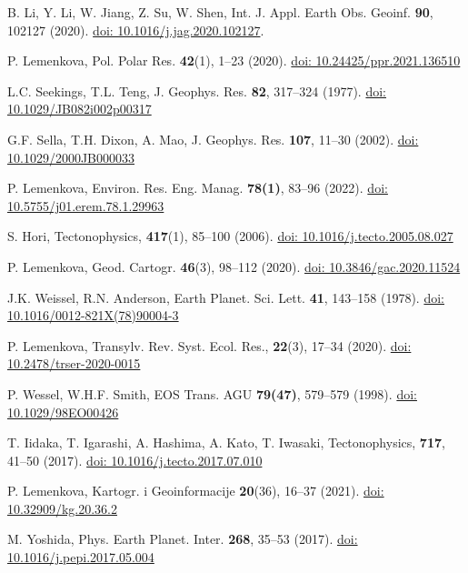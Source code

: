 \documentclass{rrparticle}
\begin{document}
\begin{thebibliography}{99}
 B. Li, Y. Li, W. Jiang, Z. Su, W. Shen, Int. J. Appl. Earth Obs. Geoinf. \textbf{90}, 102127 (2020). \href{https://doi.org/10.1016/j.jag.2020.102127}{doi: 10.1016/j.jag.2020.102127}.

P. Lemenkova, Pol. Polar Res. \textbf{42}(1), 1--23 (2020). \href{https://doi.org/10.24425/ppr.2021.136510}{doi: 10.24425/ppr.2021.136510}

 L.C. Seekings, T.L. Teng, J. Geophys. Res. \textbf{82}, 317--324 (1977). \href{https://doi.org/10.1029/JB082i002p00317}{doi: 10.1029/JB082i002p00317}

 G.F. Sella, T.H. Dixon, A. Mao, J. Geophys. Res. \textbf{107}, 11--30 (2002). \href{https://doi.org/10.1029/2000JB000033}{doi: 10.1029/2000JB000033}

 P. Lemenkova, Environ. Res. Eng. Manag.  \textbf{78(1)}, 83--96 (2022). \href{https://doi.org/10.5755/j01.erem.78.1.29963}{doi: 10.5755/j01.erem.78.1.29963}

 S. Hori, Tectonophysics, \textbf{417}(1), 85--100 (2006). \href{https://doi.org/10.1016/j.tecto.2005.08.027}{doi: 10.1016/j.tecto.2005.08.027}

 P. Lemenkova, Geod. Cartogr. \textbf{46}(3), 98--112 (2020). \href{https://doi.org/10.3846/gac.2020.11524}{doi: 10.3846/gac.2020.11524}

 J.K. Weissel, R.N. Anderson, Earth Planet. Sci. Lett. \textbf{41}, 143--158 (1978). \href{https://doi.org/10.1016/0012-821X(78)90004-3}{doi: 10.1016/0012-821X(78)90004-3}

P. Lemenkova, Transylv. Rev. Syst. Ecol. Res., \textbf{22}(3), 17--34 (2020). \href{https://doi.org/10.2478/trser-2020-0015}{doi: 10.2478/trser-2020-0015}

 P. Wessel, W.H.F. Smith, EOS Trans. AGU \textbf{79(47)}, 579--579 (1998). \href{https://doi.org/10.1029/98EO00426}{doi: 10.1029/98EO00426}

 T. Iidaka, T. Igarashi, A. Hashima, A. Kato, T. Iwasaki, Tectonophysics, \textbf{717}, 41--50 (2017). \href{https://doi.org/10.1016/j.tecto.2017.07.010}{doi: 10.1016/j.tecto.2017.07.010}

 P. Lemenkova, Kartogr. i Geoinformacije \textbf{20}(36), 16--37 (2021). \href{https://doi.org/10.32909/kg.20.36.2}{doi: 10.32909/kg.20.36.2}

 M. Yoshida, Phys. Earth Planet. Inter. \textbf{268}, 35--53 (2017). \href{https://doi.org/10.1016/j.pepi.2017.05.004}{doi: 10.1016/j.pepi.2017.05.004}

\end{thebibliography}
\end{document}
